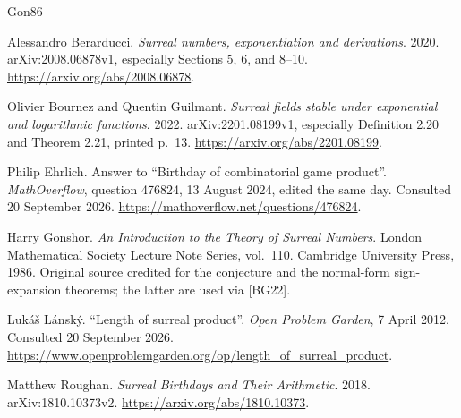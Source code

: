 \documentclass[11pt,letterpaper]{article}
\theoremstyle{definition}
\theoremstyle{remark}
\begin{document}
\begin{thebibliography}{Gon86}
\raggedright
{}
Alessandro Berarducci.
\emph{Surreal numbers, exponentiation and derivations}.
2020. arXiv:2008.06878v1, especially Sections 5, 6, and 8--10.
\url{https://arxiv.org/abs/2008.06878}.

Olivier Bournez and Quentin Guilmant.
\emph{Surreal fields stable under exponential and logarithmic functions}.
2022. arXiv:2201.08199v1, especially Definition 2.20 and Theorem 2.21,
printed p.~13. \url{https://arxiv.org/abs/2201.08199}.

Philip Ehrlich.
Answer to ``Birthday of combinatorial game product''.
\emph{MathOverflow}, question 476824, 13 August 2024, edited the same day.
Consulted 20 September 2026.
\url{https://mathoverflow.net/questions/476824}.

Harry Gonshor.
\emph{An Introduction to the Theory of Surreal Numbers}.
London Mathematical Society Lecture Note Series, vol.~110.
Cambridge University Press, 1986.
Original source credited for the conjecture and the normal-form
sign-expansion theorems; the latter are used via [BG22].

Luk\'a\v{s} L\'ansk\'y.
``Length of surreal product''.
\emph{Open Problem Garden}, 7 April 2012. Consulted 20 September 2026.
\url{https://www.openproblemgarden.org/op/length_of_surreal_product}.

Matthew Roughan.
\emph{Surreal Birthdays and Their Arithmetic}.
2018. arXiv:1810.10373v2.
\url{https://arxiv.org/abs/1810.10373}.
\end{thebibliography}
\end{document}
